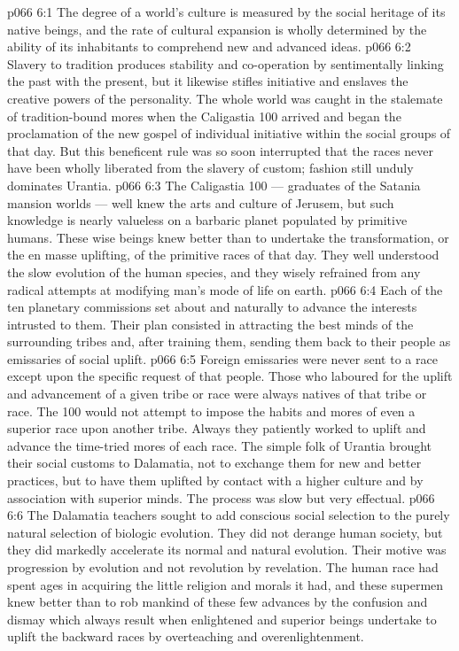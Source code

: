 \vs p066 6:1 The degree of a world’s culture is measured by the social heritage of its native beings, and the rate of cultural expansion is wholly determined by the ability of its inhabitants to comprehend new and advanced ideas.
\vs p066 6:2 Slavery to tradition produces stability and co\hyp{}operation by sentimentally linking the past with the present, but it likewise stifles initiative and enslaves the creative powers of the personality. The whole world was caught in the stalemate of tradition\hyp{}bound mores when the Caligastia 100 arrived and began the proclamation of the new gospel of individual initiative within the social groups of that day. But this beneficent rule was so soon interrupted that the races never have been wholly liberated from the slavery of custom; fashion still unduly dominates Urantia.
\vs p066 6:3 The Caligastia 100 --- graduates of the Satania mansion worlds --- well knew the arts and culture of Jerusem, but such knowledge is nearly valueless on a barbaric planet populated by primitive humans. These wise beings knew better than to undertake the  transformation, or the en masse uplifting, of the primitive races of that day. They well understood the slow evolution of the human species, and they wisely refrained from any radical attempts at modifying man’s mode of life on earth.
\vs p066 6:4 Each of the ten planetary commissions set about  and naturally to advance the interests intrusted to them. Their plan consisted in attracting the best minds of the surrounding tribes and, after training them, sending them back to their people as emissaries of social uplift.
\vs p066 6:5 Foreign emissaries were never sent to a race except upon the specific request of that people. Those who laboured for the uplift and advancement of a given tribe or race were always natives of that tribe or race. The 100 would not attempt to impose the habits and mores of even a superior race upon another tribe. Always they patiently worked to uplift and advance the time\hyp{}tried mores of each race. The simple folk of Urantia brought their social customs to Dalamatia, not to exchange them for new and better practices, but to have them uplifted by contact with a higher culture and by association with superior minds. The process was slow but very effectual.
\vs p066 6:6 The Dalamatia teachers sought to add conscious social selection to the purely natural selection of biologic evolution. They did not derange human society, but they did markedly accelerate its normal and natural evolution. Their motive was progression by evolution and not revolution by revelation. The human race had spent ages in acquiring the little religion and morals it had, and these supermen knew better than to rob mankind of these few advances by the confusion and dismay which always result when enlightened and superior beings undertake to uplift the backward races by overteaching and overenlightenment.

